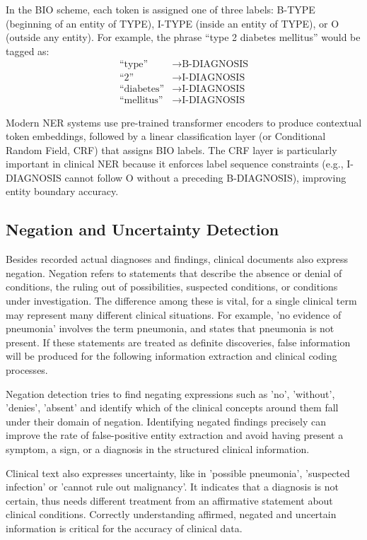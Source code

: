 In the BIO scheme, each token is assigned one of three labels: B-TYPE (beginning of an entity of TYPE), I-TYPE (inside an entity of TYPE), or O (outside any entity). For example, the phrase ``type 2 diabetes mellitus'' would be tagged as:
\begin{align*}
\text{``type''} &\rightarrow \text{B-DIAGNOSIS} \\
\text{``2''} &\rightarrow \text{I-DIAGNOSIS} \\
\text{``diabetes''} &\rightarrow \text{I-DIAGNOSIS} \\
\text{``mellitus''} &\rightarrow \text{I-DIAGNOSIS}
\end{align*}

Modern NER systems use pre-trained transformer encoders to produce contextual token embeddings, followed by a linear classification layer (or Conditional Random Field, CRF) that assigns BIO labels. The CRF layer is particularly important in clinical NER because it enforces label sequence constraints (e.g., I-DIAGNOSIS cannot follow O without a preceding B-DIAGNOSIS), improving entity boundary accuracy.

\subsection{Negation and Uncertainty Detection}

Besides recorded actual diagnoses and findings, clinical documents also express negation. Negation refers to statements that describe the absence or denial of conditions, the ruling out of possibilities, suspected conditions, or conditions under investigation. The difference among these is vital, for a single clinical term may represent many different clinical situations. For example, 'no evidence of pneumonia' involves the term pneumonia, and states that pneumonia is not present. If these statements are treated as definite discoveries, false information will be produced for the following information extraction and clinical coding processes.

Negation detection tries to find negating expressions such as 'no', 'without', 'denies', 'absent' and identify which of the clinical concepts around them fall under their domain of negation. Identifying negated findings precisely can improve the rate of false-positive entity extraction and avoid having present a symptom, a sign, or a diagnosis in the structured clinical information.

Clinical text also expresses uncertainty, like in 'possible pneumonia', 'suspected infection' or 'cannot rule out malignancy'. It indicates that a diagnosis is not certain, thus needs different treatment from an affirmative statement about clinical conditions. Correctly understanding affirmed, negated and uncertain information is critical for the accuracy of clinical data.

